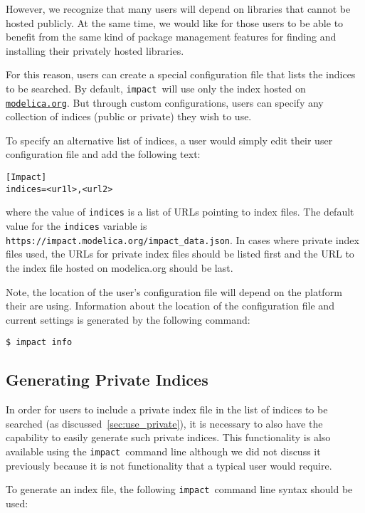 \documentclass[11pt,a4paper,twocolumn]{article}
\newcommand{\impact}{\texttt{impact}} %
\newcommand{\code}[1]{\texttt{#1}} %
\begin{document}
However, we recognize that many users will depend on libraries that
cannot be hosted publicly.  At the same time, we would like for those
users to be able to benefit from the same kind of package management
features for finding and installing their privately hosted libraries.

For this reason, users can create a special configuration file that
lists the indices to be searched.  By default, \impact\ will use only
the index hosted on \href{https://modelica.org}{\code{modelica.org}}.
But through custom configurations, users can specify any collection of
indices (public or private) they wish to use.

To specify an alternative list of indices, a user would simply edit
their user configuration file and add the following text:

\begin{verbatim}
[Impact]
indices=<ur1l>,<url2>
\end{verbatim}
where the value of \code{indices} is a list of URLs pointing to index
files.  The default value for the \code{indices} variable is
\code{https://impact.modelica.org/impact\_data.json}.  In cases where
private index files used, the URLs for private index files should be
listed first and the URL to the index file hosted on modelica.org
should be last.

Note, the location of the user's configuration file will depend on the
platform their are using.  Information about the location of the
configuration file and current settings is generated by the following
command:

\begin{verbatim}
$ impact info
\end{verbatim}

\subsection{Generating Private Indices}
\label{sec:gen_private}


In order for users to include a private index file in the list of
indices to be searched (as discussed~\ref{sec:use_private}), it is
necessary to also have the capability to easily generate such private
indices.  This functionality is also available using the
\impact\ command line although we did not discuss it previously
because it is not functionality that a typical user would require.

To generate an index file, the following \impact\ command line syntax
should be used:
\end{document}
